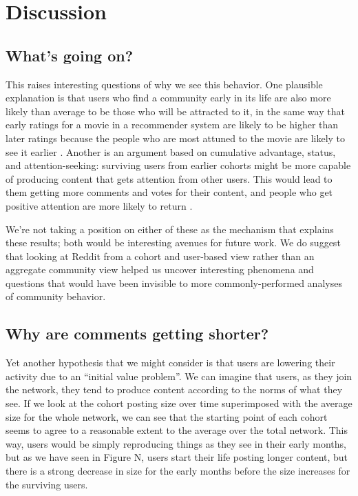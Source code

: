 \section{Discussion}

\subsection{What's going on?}

This raises interesting questions of why we see this behavior.  One plausible explanation is that users who find a community early in its life are also more likely than average to be those who will be attracted to it, in the same way that early ratings for a movie in a recommender system are likely to be higher than later ratings because the people who are most attuned to the movie are likely to see it earlier \cite{if_we_can_find_one}.  Another is an argument based on cumulative advantage, status, and attention-seeking: surviving users from earlier cohorts might be more capable of producing content that gets attention from other users.  This would lead to them getting more comments and votes for their content, and people who get positive attention are more likely to return \cite{joyce-kraut, wikipedia, everything2_papers}.  

We're not taking a position on either of these as the mechanism that explains these results; both would be interesting avenues for future work.  We do suggest that looking at Reddit from a cohort and user-based view rather than an aggregate community view helped us uncover interesting phenomena and questions that would have been invisible to more commonly-performed analyses of community behavior. 

\subsection{Why are comments getting shorter?}

Yet another hypothesis that we might consider is that users are lowering their activity due to an ``initial value problem''. We can imagine that users, as they join the network, they tend to produce content according to the norms of what they see. If we look at the cohort posting size over time superimposed with the average size for the whole network, we can see that the starting point of each cohort seems to agree to a reasonable extent to the average over the total network. This way, users would be simply reproducing things as they see in their early months, but as we have seen in Figure N, users start their life posting longer content, but there is a strong decrease in size for the early months before the size increases for the surviving users.



